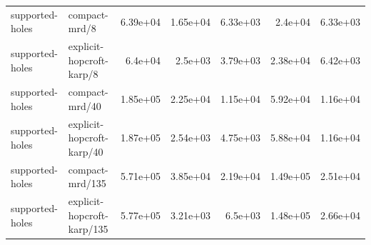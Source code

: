 \begin{table}[t]
\begin{tabular}{llrrrrr}
supported-holes & compact-mrd/8 & 6.39e+04 & 1.65e+04 & 6.33e+03 & 2.4e+04 & 6.33e+03 \\
supported-holes & explicit-hopcroft-karp/8 & 6.4e+04 & 2.5e+03 & 3.79e+03 & 2.38e+04 & 6.42e+03 \\
supported-holes & compact-mrd/40 & 1.85e+05 & 2.25e+04 & 1.15e+04 & 5.92e+04 & 1.16e+04 \\
supported-holes & explicit-hopcroft-karp/40 & 1.87e+05 & 2.54e+03 & 4.75e+03 & 5.88e+04 & 1.16e+04 \\
supported-holes & compact-mrd/135 & 5.71e+05 & 3.85e+04 & 2.19e+04 & 1.49e+05 & 2.51e+04 \\
supported-holes & explicit-hopcroft-karp/135 & 5.77e+05 & 3.21e+03 & 6.5e+03 & 1.48e+05 & 2.66e+04 \\
\bottomrule
\end{tabular}
\end{table}
